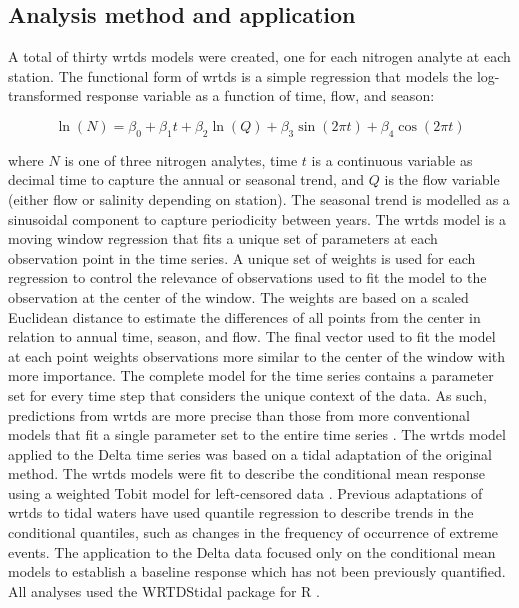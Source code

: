 \documentclass[journal = esthag, manuscript = article]{achemso}\usepackage[]{graphicx}\usepackage[]{color}
\begin{document}
\subsection{Analysis method and application}

A total of thirty \ac{wrtds} models were created, one for each nitrogen analyte at each station.  The functional form of \ac{wrtds} is a simple regression\cite{Hirsch10} that models the log-transformed response variable as a function of time, flow, and season:

\begin{equation}
\ln\left(N\right) = \beta_0 + \beta_1 t + \beta_2 \ln\left(Q\right) + \beta_3 \sin\left(2\pi t\right) + \beta_4 \cos\left(2\pi t\right)
\end{equation}  

\noindent where $N$ is one of three nitrogen analytes, time $t$ is a continuous variable as decimal time to capture the annual or seasonal trend, and $Q$ is the flow variable (either flow or salinity depending on station).  The seasonal trend is modelled as a sinusoidal component to capture periodicity between years.  The \ac{wrtds} model is a moving window regression that fits a unique set of parameters at each observation point in the time series.  A unique set of weights is used for each regression to control the relevance of observations used to fit the model to the observation at the center of the window. The weights are based on a scaled Euclidean distance to estimate the differences of all points from the center in relation to annual time, season, and flow.  The final vector used to fit the model at each point weights observations more similar to the center of the window with more importance.  The complete model for the time series contains a parameter set for every time step that considers the unique context of the data.  As such, predictions from \ac{wrtds} are more precise than those from more conventional models that fit a single parameter set to the entire time series \cite{Moyer12,Beck15}.  The \ac{wrtds} model applied to the Delta time series was based on a tidal adaptation of the original method\cite{Beck15}.  The \ac{wrtds} models were fit to describe the conditional mean response using a weighted Tobit model for left-censored data \cite{Tobin58}.  Previous adaptations of \ac{wrtds} to tidal waters have used quantile regression to describe trends in the conditional quantiles, such as changes in the frequency of occurrence of extreme events.  The application to the Delta data focused only on the conditional mean models to establish a baseline response which has not been previously quantified.  All analyses used the WRTDStidal package for R \cite{Beck16b,RDCT16}.
\end{document}
